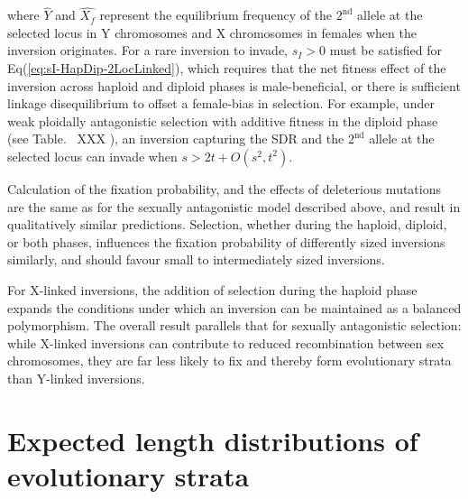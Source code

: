 \documentclass{article}
\newcommand\hl[1]{%
  \bgroup
  \hskip0pt\color{blue!80!black}%
  #1%
  \egroup
}
\begin{document}
\noindent where $\hat{Y}$ and $\hat{X_f}$ represent the equilibrium frequency of the $2^{\text{nd}}$ allele at the selected locus in Y chromosomes and X chromosomes in females when the inversion originates. For a rare inversion to invade, $s_I > 0$ must be satisfied for Eq(\ref{eq:sI-HapDip-2LocLinked}), which requires that the net fitness effect of the inversion across haploid and diploid phases is male-beneficial, or there is sufficient linkage disequilibrium to offset a female-bias in selection. For example, under weak ploidally antagonistic selection with additive fitness in the diploid phase (see Table.~\hl{XXX}), an inversion capturing the SDR and the $2^{\text{nd}}$ allele at the selected locus can invade when $s > 2 t + O(s^2,t^2)$.  

Calculation of the fixation probability, and the effects of deleterious mutations are the same as for the sexually antagonistic model described above, and result in qualitatively similar predictions. Selection, whether during the haploid, diploid, or both phases, influences the fixation probability of differently sized inversions similarly, and should favour small to intermediately sized inversions.

For X-linked inversions, the addition of selection during the haploid phase expands the conditions under which an inversion can be maintained as a balanced polymorphism. The overall result parallels that for sexually antagonistic selection: while X-linked inversions can contribute to reduced recombination between sex chromosomes, they are far less likely to fix and thereby form evolutionary strata than Y-linked inversions. \vspace{12pt}






 \section{Expected length distributions of evolutionary strata} \label{AppC:DistFixedInv}
 \renewcommand{\theequation}{D\arabic{equation}}
 \setcounter{equation}{0}
 \renewcommand{\thefigure}{D\arabic{figure}}
 \setcounter{figure}{0}
\end{document}

